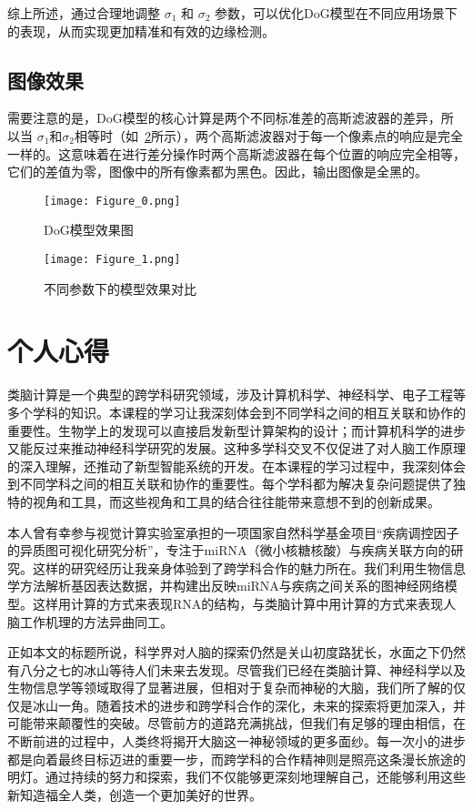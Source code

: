 \documentclass[a4paper,12pt]{article}
\begin{document}
综上所述，通过合理地调整 $\sigma_1$ 和 $\sigma_2$ 参数，可以优化DoG模型在不同应用场景下的表现，从而实现更加精准和有效的边缘检测。
\subsection{图像效果}

需要注意的是，DoG模型的核心计算是两个不同标准差的高斯滤波器的差异，所以当 $\sigma_1$和$\sigma_2$相等时（如~\ref{f1}所示），两个高斯滤波器对于每一个像素点的响应是完全一样的。这意味着在进行差分操作时两个高斯滤波器在每个位置的响应完全相等，它们的差值为零，图像中的所有像素都为黑色。因此，输出图像是全黑的。
\begin{figure}[htbp]
    \centering
    \texttt{[image: Figure\_0.png]} 
    \caption{DoG模型效果图}
    \label{f0}
\end{figure}
\begin{figure}[htbp]
    \centering
    \texttt{[image: Figure\_1.png]} 
    \caption{不同参数下的模型效果对比}
    \label{f1}
\end{figure}
\newpage
\section{个人心得}
类脑计算是一个典型的跨学科研究领域，涉及计算机科学、神经科学、电子工程等多个学科的知识。本课程的学习让我深刻体会到不同学科之间的相互关联和协作的重要性。生物学上的发现可以直接启发新型计算架构的设计；而计算机科学的进步又能反过来推动神经科学研究的发展。这种多学科交叉不仅促进了对人脑工作原理的深入理解，还推动了新型智能系统的开发。在本课程的学习过程中，我深刻体会到不同学科之间的相互关联和协作的重要性。每个学科都为解决复杂问题提供了独特的视角和工具，而这些视角和工具的结合往往能带来意想不到的创新成果。

本人曾有幸参与视觉计算实验室承担的一项国家自然科学基金项目“疾病调控因子的异质图可视化研究分析”，专注于miRNA（微小核糖核酸）与疾病关联方向的研究。这样的研究经历让我亲身体验到了跨学科合作的魅力所在。我们利用生物信息学方法解析基因表达数据，并构建出反映miRNA与疾病之间关系的图神经网络模型。这样用计算的方式来表现RNA的结构，与类脑计算中用计算的方式来表现人脑工作机理的方法异曲同工。

正如本文的标题所说，科学界对人脑的探索仍然是关山初度路犹长，水面之下仍然有八分之七的冰山等待人们未来去发现。尽管我们已经在类脑计算、神经科学以及生物信息学等领域取得了显著进展，但相对于复杂而神秘的大脑，我们所了解的仅仅是冰山一角。随着技术的进步和跨学科合作的深化，未来的探索将更加深入，并可能带来颠覆性的突破。尽管前方的道路充满挑战，但我们有足够的理由相信，在不断前进的过程中，人类终将揭开大脑这一神秘领域的更多面纱。每一次小的进步都是向着最终目标迈进的重要一步，而跨学科的合作精神则是照亮这条漫长旅途的明灯。通过持续的努力和探索，我们不仅能够更深刻地理解自己，还能够利用这些新知造福全人类，创造一个更加美好的世界。
\end{document}
